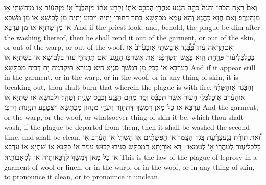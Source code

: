 {וְאִם֮ רָאָ֣ה הַכֹּהֵן֒ וְהִנֵּה֙ כֵּהָ֣ה הַנֶּ֔גַע אַחֲרֵ֖י הֻכַּבֵּ֣ס אֹת֑וֹ וְקָרַ֣ע אֹת֗וֹ מִן\maqqaf הַבֶּ֙גֶד֙ א֣וֹ מִן\maqqaf הָע֔וֹר א֥וֹ מִן\maqqaf הַשְּׁתִ֖י א֥וֹ מִן\maqqaf הָעֵֽרֶב׃}
{וְאִם חֲזָא כָהֲנָא וְהָא עֲמָא מַכְתָּשָׁא בָּתַר דְּחַוַּרוּ יָתֵיהּ וִיבַזַּע יָתֵיהּ מִן לְבוּשָׁא אוֹ מִן מַשְׁכָּא אוֹ מִן שִׁתְיָא אוֹ מִן עִרְבָּא׃}
{And if the priest look, and, behold, the plague be dim after the washing thereof, then he shall rend it out of the garment, or out of the skin, or out of the warp, or out of the woof.}{}
{וְאִם\maqqaf תֵּרָאֶ֨ה ע֜וֹד בַּ֠בֶּ֠גֶד אֽוֹ\maqqaf בַשְּׁתִ֤י אֽוֹ\maqqaf בָעֵ֙רֶב֙ א֣וֹ בְכׇל\maqqaf כְּלִי\maqqaf ע֔וֹר פֹּרַ֖חַת הִ֑וא בָּאֵ֣שׁ תִּשְׂרְפֶ֔נּוּ אֵ֥ת אֲשֶׁר\maqqaf בּ֖וֹ הַנָּֽגַע׃}
{וְאִם תִּתַּחְזֵי עוֹד בִּלְבוּשָׁא אוֹ בְשִׁתְיָא אוֹ בְעִרְבָּא אוֹ בְכָל מָן דִּמְשַׁךְ סָגְיָא הִיא בְּנוּרָא תֵּיקְדִנֵּיהּ יָת דְּבֵיהּ מַכְתָּשָׁא׃}
{And if it appear still in the garment, or in the warp, or in the woof, or in any thing of skin, it is breaking out, thou shalt burn that wherein the plague is with fire.}{}
{וְהַבֶּ֡גֶד אֽוֹ\maqqaf הַשְּׁתִ֨י אוֹ\maqqaf הָעֵ֜רֶב אֽוֹ\maqqaf כׇל\maqqaf כְּלִ֤י הָעוֹר֙ אֲשֶׁ֣ר תְּכַבֵּ֔ס וְסָ֥ר מֵהֶ֖ם הַנָּ֑גַע וְכֻבַּ֥ס שֵׁנִ֖ית וְטָהֵֽר׃}
{וּלְבוּשָׁא אוֹ שִׁתְיָא אוֹ עִרְבָּא אוֹ כָל מָאן דִּמְשַׁךְ דִּתְחַוַּר וְיִעְדֵּי מִנְּהוֹן מַכְתָּשָׁא וְיִצְטַבַּע תִּנְיָנוּת וְיִדְכֵּי׃}
{And the garment, or the warp, or the woof, or whatsoever thing of skin it be, which thou shalt wash, if the plague be departed from them, then it shall be washed the second time, and shall be clean.}{}
{זֹ֠את תּוֹרַ֨ת נֶֽגַע\maqqaf צָרַ֜עַת בֶּ֥גֶד הַצֶּ֣מֶר \legarmeh  א֣וֹ הַפִּשְׁתִּ֗ים א֤וֹ הַשְּׁתִי֙ א֣וֹ הָעֵ֔רֶב א֖וֹ כׇּל\maqqaf כְּלִי\maqqaf ע֑וֹר לְטַהֲר֖וֹ א֥וֹ לְטַמְּאֽוֹ׃ \petucha }
{דָּא אוֹרָיְתָא דְּמַכְתָּשׁ סְגִירוּ לְבוּשׁ עַמַּר אוֹ כִתָּנָא אוֹ שִׁתְיָא אוֹ עִרְבָּא אוֹ כָל מָאן דִּמְשַׁךְ לְדַכָּאוּתֵיהּ אוֹ לְסַאָבוּתֵיהּ׃}
{This is the law of the plague of leprosy in a garment of wool or linen, or in the warp, or in the woof, or in any thing of skin, to pronounce it clean, or to pronounce it unclean.}{}

